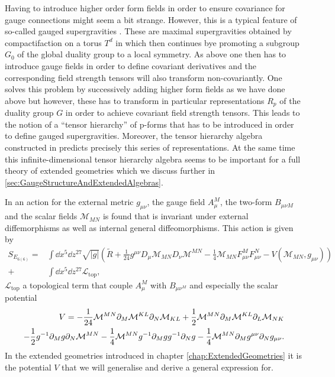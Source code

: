 Having to introduce higher order form fields in order to ensure covariance for gauge connections might seem a bit strange. However, this is a typical feature of so-called gauged supergravities \cite{deWitTensorHierarchies2008}. These are maximal supergravities obtained by compactifaction on a torus $T^d$ in which then continues bye promoting a subgroup $G_0$ of the global duality group to a local symmetry. As above one then has to introduce gauge fields in order to define covariant derivatives and the corresponding field strength tensors will also transform non-covariantly. One solves this problem by successively adding higher form fields as we have done above but however, these has to transform in particular representations $R_p$ of the duality group $G$ in order to achieve covariant field strength tensors. This leads to the notion of a ``tensor hierarchy'' of p-forms that has to be introduced in order to define gauged supergravities. Moreover, the tensor hierarchy algebra constructed in \cite{Palmkvist:2013vya} predicts precisely this series of representations. At the same time this infinite-dimensional tensor hierarchy algebra seems to be important for a full theory of extended geometries which we discuss further in \ref{sec:GaugeStructureAndExtendedAlgebras}. 

In \cite{E62014} an action for the external metric $g_{\mu\nu}$, the gauge field $A^M_\mu$, the two-form $B_{\mu\nu M}$ and the scalar fields $\mathcal{M}_{MN}$ is found that is invariant under external diffemorphisms as well as internal general diffeomorphisms. This action is given by 
\begin{equation}\label{eq:E6Action}\begin{aligned}
    S_{E_{6(6)}} = &\int \dd x^5\dd z^{27} \sqrt{|g|}\left(\tilde{R}+\frac{1}{24}g^{\mu\nu}D_\mu \mathcal{M}_{MN}D_\nu\mathcal{M}^{MN}-\frac{1}{4}\mathcal{M}_{MN}F^M_{\mu\nu}F^N_{\mu\nu}-V(\mathcal{M}_{MN},g_{\mu\nu})\right)\\
    +&\int \dd x^5\dd z^{27}\mathcal{L}_{\text{top}},
    \end{aligned}
\end{equation}
$\mathcal{L}_{\text{top}}$ a topological term that couple $A_\mu^M$ with $B_{\mu\nu^M}$ and especially the scalar potential 
\begin{equation}
    \begin{aligned}
    V = -\frac{1}{24}\mathcal{M}^{MN}\partial_M\mathcal{M}^{KL}\partial_N\mathcal{M}_{KL}+\frac{1}{2}\mathcal{M}^{MN}\partial_M\mathcal{M}^{KL}\partial_L\mathcal{M}_{NK}\\
    -\frac{1}{2}g^{-1}\partial_M g\partial_N\mathcal{M}^{MN}-\frac{1}{4}\mathcal{M}^{MN}g^{-1}\partial_Mgg^{-1}\partial_Ng-\frac{1}{4}\mathcal{M}^{MN}\partial_Mg^{\mu\nu}\partial_Ng_{\mu\nu}. 
    \end{aligned}
\end{equation}
In the extended geometries introduced in chapter \ref{chap:ExtendedGeometries} it is the potential $V$ that we will generalise and derive a general expression for. 


